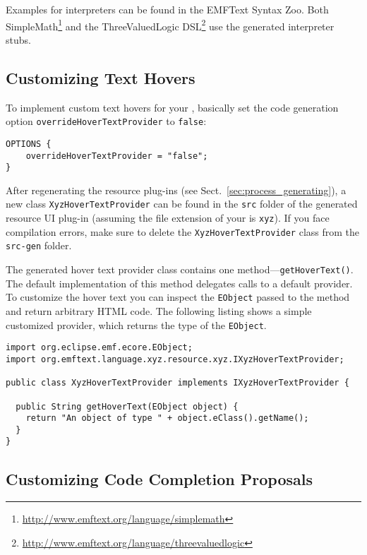Examples for interpreters can be found in the EMFText Syntax
Zoo. Both SimpleMath\footnote{\url{http://www.emftext.org/language/simplemath}}
and the ThreeValuedLogic
DSL\footnote{\url{http://www.emftext.org/language/threevaluedlogic}} use the
generated interpreter stubs.

\subsection{Customizing Text Hovers}

To implement custom text hovers for your \DSL, basically set the code
generation option \texttt{overrideHoverTextProvider} to \texttt{false}:

\lstset{language=CS}
\begin{lstlisting}
OPTIONS {
    overrideHoverTextProvider = "false";
}
\end{lstlisting}

After regenerating the resource plug-ins (see
Sect.~\ref{sec:process_generating}), a new class
\texttt{XyzHoverTextProvider} can be found in the \texttt{src} folder of the
generated resource UI plug-in (assuming the file extension of your \DSL is \texttt{xyz}).
If you face compilation errors, make sure to delete the \texttt{XyzHoverTextProvider} 
class from the \texttt{src-gen} folder.

The generated hover text provider class contains one
method---\texttt{getHoverText()}. The default implementation of this
method delegates calls to a default provider. To customize the
hover text you can inspect the \texttt{EObject} passed to the method and return arbitrary HTML code. The
following listing shows a simple customized provider, which returns the type of
the \texttt{EObject}.

\lstset{language=Java}
\begin{lstlisting}
import org.eclipse.emf.ecore.EObject;
import org.emftext.language.xyz.resource.xyz.IXyzHoverTextProvider;

public class XyzHoverTextProvider implements IXyzHoverTextProvider {
	
  public String getHoverText(EObject object) {
    return "An object of type " + object.eClass().getName();
  }
}
\end{lstlisting}

\subsection{Customizing Code Completion Proposals}
\label{sec:cust_code_completion}

